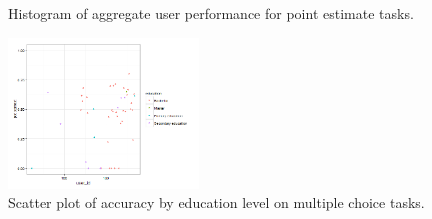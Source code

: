 \documentclass[12pt]{article}
\begin{document}
\begin{figure}[ht!]
     \begin{center}
    \end{center}
    \caption{Histogram of aggregate user performance for point estimate tasks.}
\end{figure}


\begin{figure}[ht!]
\begin{center}
\includegraphics[width=0.45\textwidth]{../../output/demo_analysis/scatter_edu.png}
\caption{Scatter plot of accuracy by education level on multiple choice tasks.}
\end{center}	
\end{figure}
\end{document}
